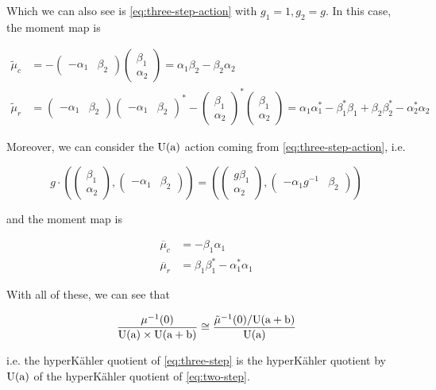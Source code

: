\documentclass{article}
\begin{document}
Which we can also see is \cref{eq:three-step-action} with \(g_1 = 1, g_2 = g\). In this case, the moment map is

\begin{align*}
    \tilde \mu_c &= -\begin{pmatrix}
        -\alpha_1 & \beta_2
    \end{pmatrix}\begin{pmatrix}
        \beta_1 \\ \alpha_2
    \end{pmatrix} = \alpha_1\beta_2 - \beta_2\alpha_2 \\
    \tilde \mu_r &= \begin{pmatrix}
        -\alpha_1 & \beta_2
    \end{pmatrix}\begin{pmatrix}
        -\alpha_1 & \beta_2
    \end{pmatrix}^* - \begin{pmatrix}
        \beta_1 \\ \alpha_2
    \end{pmatrix}^*\begin{pmatrix}
        \beta_1 \\ \alpha_2
    \end{pmatrix} = \alpha_1\alpha_1^* - \beta_1^*\beta_1 + \beta_2\beta_2^* - \alpha_2^*\alpha_2
\end{align*}

Moreover, we can consider the \(\rm U(a)\) action coming from \cref{eq:three-step-action}, i.e. 

\[g \cdot \left(\begin{pmatrix}
    \beta_1 \\ \alpha_2
\end{pmatrix}, \begin{pmatrix}
    -\alpha_1 & \beta_2
\end{pmatrix}\right) = \left(\begin{pmatrix}
    g\beta_1 \\ \alpha_2
\end{pmatrix}, \begin{pmatrix}
    -\alpha_1 g^{-1} & \beta_2
\end{pmatrix}\right)\]

and the moment map is

\begin{align*}
    \overline \mu_c &= -\beta_1\alpha_1 \\
    \overline \mu_r &= \beta_1\beta_1^* - \alpha_1^*\alpha_1
\end{align*}

With all of these, we can see that

\[\frac{\mu^{-1}(0)}{\rm U(a) \times \rm U(a + b)} \cong \frac{\tilde \mu^{-1}(0)/\rm U(a + b)}{\rm U(a)}\]

i.e. the hyperK\"ahler quotient of \cref{eq:three-step} is the hyperK\"ahler quotient by \(\rm U(a)\) of the hyperK\"ahler quotient of \cref{eq:two-step}.

\printbibliography
\end{document}
